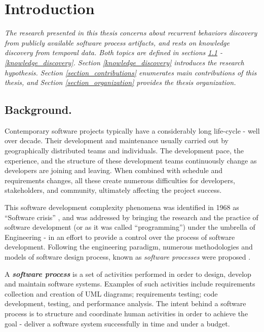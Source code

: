\chapter{Introduction}

\textit{The research presented in this thesis concerns about recurrent behaviors discovery from
publicly available software process artifacts, and rests on knowledge discovery from
temporal data. Both topics are defined in sections \ref{section_background} - \ref{knowledge_discovery}. 
Section \ref{knowledge_discovery} introduces the research hypothesis.
Section \ref{section_contributions} enumerates main contributions of this thesis,
and Section \ref{section_organization} provides the thesis organization.
}

\section{Background.}\label{section_background}
Contemporary software projects typically have a considerably long life-cycle - well over decade.
Their development and maintenance usually carried out by geographically distributed teams 
and individuals. The development pace, the experience, and the structure of these development 
teams continuously change as developers are joining and leaving. When combined with
schedule and requirements changes, all these create numerous difficulties 
for developers, stakeholders, and community, ultimately affecting the project success. 

This software development complexity phenomena was identified in 1968 as ``Software crisis'' \cite{crisis}, 
and was addressed by bringing the research and the practice of software development 
(or as it was called ``programming'') under the umbrella of Engineering - in an effort to provide a 
control over the process of software development. 
Following the engineering paradigm, numerous methodologies and models of 
software design process, known as \textit{software processes} were proposed \cite{citeulike:10002165}.

A \textbf{\textit{software process}} is a set of activities performed in order to design, develop and maintain 
software systems. Examples of such activities include requirements collection and creation of UML diagrams;
requirements testing; code development, testing, and performance analysis. 
The intent behind a software process is to structure and coordinate human activities in order to achieve 
the goal - deliver a software system successfully in time and under a budget.

